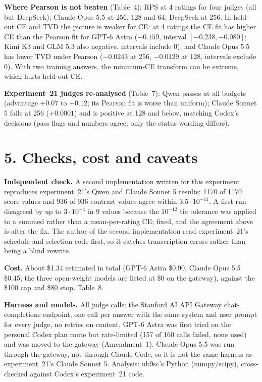 \documentclass[10pt]{article}
\begin{document}
\textbf{Where Pearson is not beaten} (Table~4): RPS at 4 ratings for four judges (all but DeepSeek); Claude Opus 5.5 at 256, 128 and 64; DeepSeek at 256. In held-out CE and TVD the picture is weaker for CE: at 4 ratings the CE fit has higher CE than the Pearson fit for GPT-6 Astra ($-0.159$, interval $[-0.238,-0.080]$; Kimi K3 and GLM 5.3 also negative, intervals include 0), and Claude Opus 5.5 has lower TVD under Pearson ($-0.0243$ at 256, $-0.0129$ at 128, intervals exclude 0). With two training answers, the minimum-CE transform can be extreme, which hurts held-out CE.

\textbf{Experiment~21 judges re-analysed} (Table~7): Qwen passes at all budgets (advantage $+0.07$ to $+0.12$; its Pearson fit is worse than uniform); Claude Sonnet 5 fails at 256 ($+0.0001$) and is positive at 128 and below, matching Codex's decisions (pass flags and numbers agree; only the status wording differs).

\section*{5. Checks, cost and caveats}
\textbf{Independent check.} A second implementation written for this experiment reproduces experiment~21's Qwen and Claude Sonnet 5 results: 1170 of 1170 score values and 936 of 936 contrast values agree within $3.5\cdot10^{-11}$. A first run disagreed by up to $3\cdot10^{-4}$ in 9 values because the $10^{-12}$ tie tolerance was applied to a summed rather than a mean-per-rating CE; fixed, and the agreement above is after the fix. The author of the second implementation read experiment~21's schedule and selection code first, so it catches transcription errors rather than being a blind rewrite.

\textbf{Cost.} About \$1.34 estimated in total (GPT-6 Astra \$0.90, Claude Opus 5.5 \$0.45; the three open-weight models are listed at \$0 on the gateway), against the \$100 cap and \$80 stop. Table~8.

\textbf{Harness and models.} All judge calls: the Stanford AI API Gateway chat-completions endpoint, one call per answer with the same system and user prompt for every judge, no retries on content. GPT-6 Astra was first tried on the personal Codex plan route but rate-limited (157 of 160 calls failed, none used) and was moved to the gateway (Amendment~1). Claude Opus 5.5 was run through the gateway, not through Claude Code, so it is not the same harness as experiment~21's Claude Sonnet 5. Analysis: ub9sc's Python (numpy/scipy), cross-checked against Codex's experiment~21 code.
\end{document}
